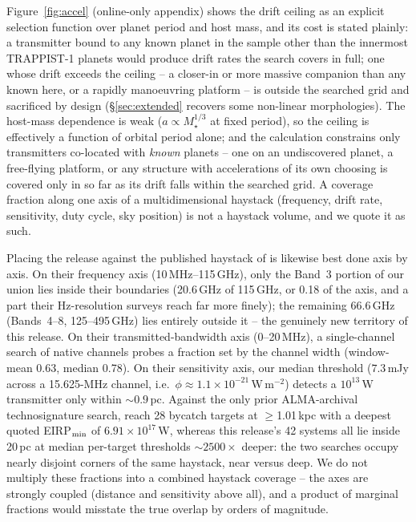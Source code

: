 \documentclass{openjournal}
\begin{document}
Figure~\ref{fig:accel} (online-only appendix) shows the drift ceiling
as an explicit selection function over planet period and host mass,
and its cost is stated plainly: a transmitter bound to any known
planet in the sample other than the innermost TRAPPIST-1 planets
would produce drift rates the search covers in full; one whose drift
exceeds the ceiling -- a closer-in or more massive companion than any
known here, or a rapidly manoeuvring platform -- is outside the
searched grid and sacrificed by design (\S\ref{sec:extended} recovers
some non-linear morphologies). The host-mass dependence is weak
($a \propto M_\star^{1/3}$ at fixed period), so the ceiling is
effectively a function of orbital period alone; and the calculation
constrains only transmitters co-located with \emph{known} planets --
one on an undiscovered planet, a free-flying platform, or any
structure with accelerations of its own choosing is covered only in
so far as its drift falls within the searched grid. A coverage
fraction along one axis of a multidimensional haystack (frequency,
drift rate, sensitivity, duty cycle, sky position) is not a haystack
volume, and we quote it as such.

Placing the release against the published haystack of
\citet{Wright2018} is likewise best done axis by axis. On their
frequency axis (10\,MHz--115\,GHz), only the Band~3 portion of our
union lies inside their boundaries (20.6\,GHz of 115\,GHz, or 0.18 of
the axis, and a part their Hz-resolution surveys reach far more
finely); the remaining 66.6\,GHz (Bands~4--8, 125--495\,GHz) lies
entirely outside it -- the genuinely new territory of this release.
On their transmitted-bandwidth axis (0--20\,MHz), a single-channel
search of native channels probes a fraction set by the channel width
(window-mean 0.63, median 0.78). On their sensitivity axis, our
median threshold ($7.3$\,mJy across a 15.625-MHz channel, i.e.\
$\phi\approx1.1\times10^{-21}$\,W\,m$^{-2}$) detects a $10^{13}$\,W
transmitter only within ${\sim}0.9$\,pc. Against the only prior
ALMA-archival technosignature search, \citet{Mason2024} reach 28
bycatch targets at $\geq$1.01\,kpc with a deepest quoted
EIRP$_{\rm min}$ of $6.91\times10^{17}$\,W, whereas this release's 42
systems all lie inside 20\,pc at median per-target thresholds
${\sim}2500\times$ deeper: the two searches occupy nearly disjoint
corners of the same haystack, near versus deep. We do not multiply
these fractions into a combined haystack coverage -- the axes are
strongly coupled (distance and sensitivity above all), and a product
of marginal fractions would misstate the true overlap by orders of
magnitude.
\end{document}
